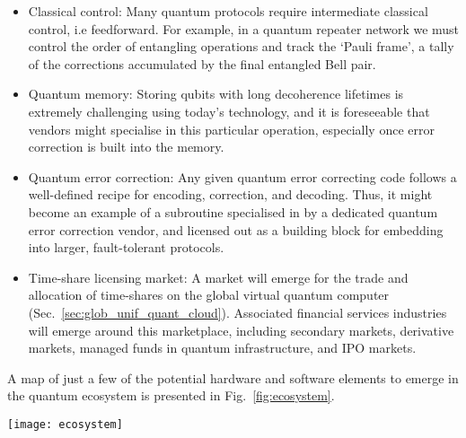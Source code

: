 \begin{itemize}
\item Classical control: Many quantum protocols require intermediate classical control, i.e feedforward. For example, in a quantum repeater network we must control the order of entangling operations and track the `Pauli frame', a tally of the corrections accumulated by the final entangled Bell pair.

\item Quantum memory: Storing qubits with long decoherence lifetimes is extremely challenging using today's technology, and it is foreseeable that vendors might specialise in this particular operation, especially once error correction is built into the memory. 

\item Quantum error correction: Any given quantum error correcting code follows a well-defined recipe for encoding, correction, and decoding. Thus, it might become an example of a subroutine specialised in by a dedicated quantum error correction vendor, and licensed out as a building block for embedding into larger, fault-tolerant protocols.

\item Time-share licensing market: A market will emerge for the trade and allocation of time-shares on the global virtual quantum computer (Sec.~\ref{sec:glob_unif_quant_cloud}). Associated financial services industries will emerge around this marketplace, including secondary markets, derivative markets, managed funds in quantum infrastructure, and IPO markets.
\end{itemize}

A map of just a few of the potential hardware and software elements to emerge in the quantum ecosystem is presented in Fig.~\ref{fig:ecosystem}.

\begin{figure*}[!htpb]
\texttt{[image: ecosystem]}
\caption{Map of just a few of the elements of the quantum ecosystem that are likely to arise with the advent of the quantum internet. The distinct units could become areas of specialisation for quantum vendors, which might be licensed out or sold to customers as discrete units, or as complete integrated processing pipelines, all outsourced and distributed over the quantum network.}\label{fig:ecosystem}	
\end{figure*}